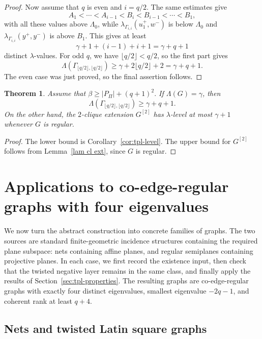 \documentclass[reqno,a4paper,11pt]{article}
\newtheorem{thm}{Theorem}[section]
\theoremstyle{definition}
\theoremstyle{remark}
\begin{document}
\begin{proof}
Now assume that $q$ is even and $i=q/2$.
The same estimates give
\[
A_1<\cdots<A_{i-1}<B_i<B_{i-1}<\cdots<B_1,
\]
with all these values above $\Lambda_0$, while $\lambda_{\Gamma_{i,i}}(u_1^+,w^-)$ is below $\Lambda_0$ and $\lambda_{\Gamma_{i,i}}(y^+,y^-)$ is above $B_1$.
This gives at least
\[
\gamma+1+(i-1)+i+1=\gamma+q+1
\]
distinct $\lambda$-values.
For odd \(q\), we have \(\lfloor q/2\rfloor<q/2\), so the first part gives
\[
\Lambda(\Gamma_{\lfloor q/2\rfloor,\lfloor q/2\rfloor})
\ge \gamma+2\lfloor q/2\rfloor+2
=\gamma+q+1.
\]
The even case was just proved, so the final assertion follows.
\end{proof}

\begin{thm}\label{thm:tpl-lambda}
Assume that
$\beta\ge |P_\Pi|+(q+1)^2.$
If $\Lambda(G)=\gamma$, then
\[
\Lambda(\Gamma_{\lfloor q/2\rfloor,\lfloor q/2\rfloor})\ge \gamma+q+1.
\]
On the other hand, the $2$-clique extension $G^{[2]}$ has $\lambda$-level at most $\gamma+1$ whenever $G$ is regular.
\end{thm}

\begin{proof}
The lower bound is Corollary~\ref{cor:tpl-level}.
The upper bound for $G^{[2]}$ follows from Lemma~\ref{lam cl ext}, since $G$ is regular.
\end{proof}

\section{Applications to co-edge-regular graphs with four eigenvalues}\label{sec:applications}

We now turn the abstract construction into concrete families of graphs.
The two sources are standard finite-geometric incidence structures containing the required plane subspace: nets containing affine planes, and regular semiplanes containing projective planes.
In each case, we first record the existence input, then check that the twisted negative layer remains in the same class, and finally apply the results of Section~\ref{sec:tpl-properties}.
The resulting graphs are co-edge-regular graphs with exactly four distinct eigenvalues, smallest eigenvalue $-2q-1$, and coherent rank at least $q+4$.


\subsection{Nets and twisted Latin square graphs}\label{ls}
\end{document}

